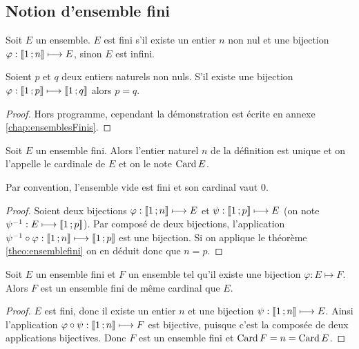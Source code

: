 \subsection{Notion d'ensemble fini}

\begin{defdef}
  Soit \(E\) un ensemble. \(E\) est fini s'il existe un entier \(n\) non nul et une bijection \(\varphi:\mathopen{\llbracket}1\mathclose{}\mathpunct{};n\mathclose{\rrbracket} \longmapsto E\), sinon \(E\) est infini.
\end{defdef}
\begin{theo}\label{theo:ensemblefini}
  Soient \(p\) et \(q\) deux entiers naturels non nuls. S'il existe une bijection \(\varphi:\mathopen{\llbracket}1\mathclose{}\mathpunct{};p\mathclose{\rrbracket} \longmapsto \mathopen{\llbracket}1\mathclose{}\mathpunct{};q\mathclose{\rrbracket}\) alors \(p=q\).
\end{theo}
\begin{proof}
  Hors programme, cependant la démonstration est écrite en annexe~
\ref{chap:ensemblesFinis}.
\end{proof}
\begin{prop}[Définition]
  Soit \(E\) un ensemble fini. Alors l'entier naturel \(n\) de la définition est unique et on l'appelle le cardinale de \(E\) et on le note \(\operatorname{Card} E\).
\end{prop}
Par convention, l'ensemble vide est fini et son cardinal vaut \(0\).
\begin{proof}
    Soient deux bijections \(\varphi:\mathopen{\llbracket}1\mathclose{}\mathpunct{};n\mathclose{\rrbracket} \longmapsto E\) et \(\psi:\mathopen{\llbracket}1\mathclose{}\mathpunct{};p\mathclose{\rrbracket} \longmapsto E\) (on note \(\psi^{-1}:E \longmapsto \mathopen{\llbracket}1\mathclose{}\mathpunct{};p\mathclose{\rrbracket}\)). Par composé de deux bijections, l'application \(\psi^{-1}\circ \varphi: \mathopen{\llbracket}1\mathclose{}\mathpunct{};n\mathclose{\rrbracket} \longmapsto \mathopen{\llbracket}1\mathclose{}\mathpunct{};p\mathclose{\rrbracket}\) est une bijection. Si on applique le théorème~
\ref{theo:ensemblefini} on en déduit donc que \(n=p\).
\end{proof}
\begin{prop}
  Soit \(E\) un ensemble fini et \(F\) un ensemble tel qu'il existe une bijection \(\varphi:E\longmapsto F\). Alors \(F\) est un ensemble fini de même cardinal que \(E\).
\end{prop}
\begin{proof}
  \(E\) est fini, donc il existe un entier \(n\) et une bijection \(\psi:\mathopen{\llbracket}1\mathclose{}\mathpunct{};n\mathclose{\rrbracket} \longmapsto E\). Ainsi l'application \(\varphi\circ\psi:\mathopen{\llbracket}1\mathclose{}\mathpunct{};n\mathclose{\rrbracket} \longmapsto F\) est bijective, puisque c'est la composée de deux applications bijectives. Donc \(F\) est un ensemble fini et \(\operatorname{Card} F=n=\operatorname{Card} E\).
\end{proof}

